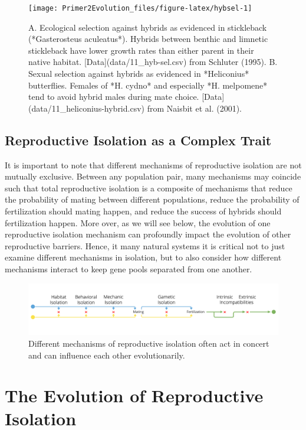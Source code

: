 \documentclass[
]{book}
\begin{document}
\begin{figure}
\texttt{[image: Primer2Evolution\_files/figure-latex/hybsel-1]} \caption{A. Ecological selection against hybrids as evidenced in stickleback (*Gasterosteus aculeatus*). Hybrids between benthic and limnetic stickleback have lower growth rates than either parent in their native habitat. [Data](data/11_hyb-sel.csv) from Schluter (1995). B. Sexual selection against hybrids as evidenced in *Heliconius* butterflies. Females of *H. cydno* and especially *H. melpomene* tend to avoid hybrid males during mate choice. [Data](data/11_heliconius-hybrid.csv) from Naisbit et al. (2001).}\label{fig:hybsel}
\end{figure}

\hypertarget{reproductive-isolation-as-a-complex-trait}{%
\subsection{Reproductive Isolation as a Complex Trait}\label{reproductive-isolation-as-a-complex-trait}}

It is important to note that different mechanisms of reproductive isolation are not mutually exclusive. Between any population pair, many mechanisms may coincide such that total reproductive isolation is a composite of mechanisms that reduce the probability of mating between different populations, reduce the probability of fertilization should mating happen, and reduce the success of hybrids should fertilization happen. More over, as we will see below, the evolution of one reproductive isolation mechanism can profoundly impact the evolution of other reproductive barriers. Hence, it many natural systems it is critical not to just examine different mechanisms in isolation, but to also consider how different mechanisms interact to keep gene pools separated from one another.

\begin{figure}
\includegraphics[width=1\linewidth]{images/incompats} \caption{Different mechanisms of reproductive isolation often act in concert and can influence each other evolutionarily.}\label{fig:incomps}
\end{figure}

\hypertarget{the-evolution-of-reproductive-isolation}{%
\section{The Evolution of Reproductive Isolation}\label{the-evolution-of-reproductive-isolation}}
\end{document}
